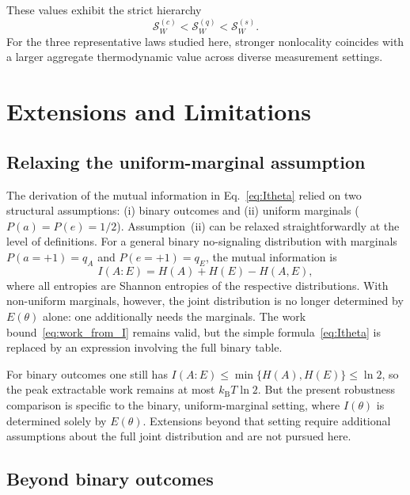 \documentclass[pra,twocolumn,showpacs,preprintnumbers,amsmath,amssymb,longbibliography,
               superscriptaddress]{revtex4-2}
\begin{document}
{These values exhibit the strict hierarchy
\begin{equation}
\mathcal{S}_W^{(c)} < \mathcal{S}_W^{(q)}
  < \mathcal{S}_W^{(s)}.
\end{equation}
For the three representative laws studied here, stronger nonlocality
coincides with a larger aggregate thermodynamic value across diverse
measurement settings.}

\section{{Extensions and Limitations}}
\label{sec:extensions}

\subsection{{Relaxing the uniform-marginal assumption}}
\label{sec:non_uniform}

{The derivation of the mutual information in Eq.~\eqref{eq:Itheta}
relied on two structural assumptions: (i) binary outcomes and
(ii) uniform marginals ($P(a) = P(e) = 1/2$).
Assumption~(ii) can be relaxed straightforwardly at the level of
definitions.
For a general binary no-signaling distribution with marginals
$P(a{=}+1) = q_A$ and $P(e{=}+1) = q_E$, the mutual information is
\begin{equation}
I(A{:}E) = H(A) + H(E) - H(A,E),
\label{eq:I_general_binary}
\end{equation}
where all entropies are Shannon entropies of the respective
distributions.
With non-uniform marginals, however, the joint distribution is no longer
determined by $E(\theta)$ alone: one additionally needs the marginals.
The work bound~\eqref{eq:work_from_I} remains valid, but the simple
formula~\eqref{eq:Itheta} is replaced by an expression involving the
full binary table.}

{For binary outcomes one still has
$I(A{:}E) \le \min\{H(A), H(E)\} \le \ln 2$, so the peak
extractable work remains at most $k_{\mathrm{B}}T\ln 2$.
But the present robustness comparison is specific to the binary,
uniform-marginal setting, where $I(\theta)$ is determined solely by
$E(\theta)$.
Extensions beyond that setting require additional assumptions about the
full joint distribution and are not pursued here.}

\subsection{{Beyond binary outcomes}}
\label{sec:beyond_binary}
\end{document}
